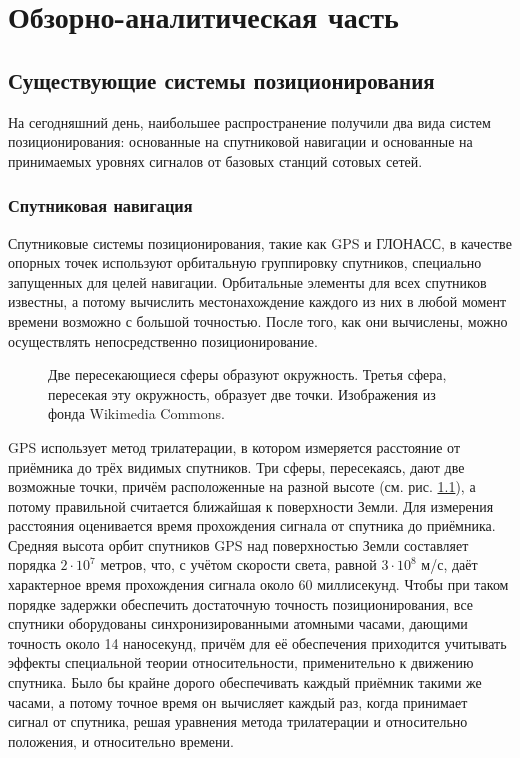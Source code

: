 \chapter{Обзорно-аналитическая часть}
\section{Существующие системы позиционирования}
На сегодняшний день, наибольшее распространение получили\cite{ruwikilbs} два вида систем позиционирования: основанные на спутниковой навигации и основанные на принимаемых уровнях сигналов от базовых станций сотовых сетей.

\subsection{Спутниковая навигация}
\label{subsec:satnav}
Спутниковые системы позиционирования, такие как GPS и ГЛОНАСС, в качестве опорных точек используют орбитальную группировку спутников, специально запущенных для целей навигации. Орбитальные элементы для всех спутников известны, а потому вычислить местонахождение каждого из них в любой момент времени возможно с большой точностью. После того, как они вычислены, можно осуществлять непосредственно позиционирование.

\begin{figure}[h]
	\caption{Две пересекающиеся сферы образуют окружность. Третья сфера, пересекая эту окружность, образует две точки. Изображения из фонда Wikimedia Commons.}
	\label{fig:2-3-spheres-intersect}
\end{figure}
GPS использует метод трилатерации, в котором измеряется расстояние от приёмника до трёх видимых спутников. Три сферы, пересекаясь, дают две возможные точки, причём расположенные на разной высоте (см. рис. \ref{fig:2-3-spheres-intersect}), а потому правильной считается ближайшая к поверхности Земли. Для измерения расстояния оценивается время прохождения сигнала от спутника до приёмника. Средняя высота орбит спутников GPS над поверхностью Земли составляет порядка $2\cdot10^7$ метров\cite{enwikigps}, что, с учётом скорости света, равной $3\cdot10^8$ м/с, даёт характерное время прохождения сигнала около 60 миллисекунд. Чтобы при таком порядке задержки обеспечить достаточную точность позиционирования, все спутники оборудованы синхронизированными атомными часами, дающими точность около 14 наносекунд\cite{enwikigps}, причём для её обеспечения приходится учитывать эффекты специальной теории относительности, применительно к движению спутника. Было бы крайне дорого обеспечивать каждый приёмник такими же часами, а потому точное время он вычисляет каждый раз, когда принимает сигнал от спутника, решая уравнения метода трилатерации и относительно положения, и относительно времени.

